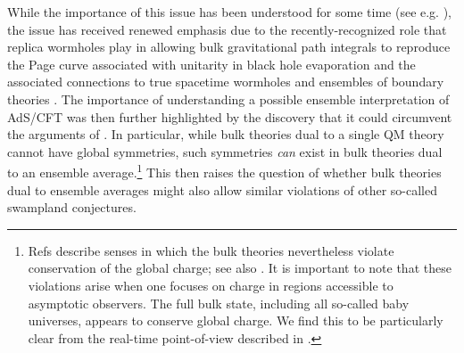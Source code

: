 \documentclass[11pt]{article}
\begin{document}
While the importance of this issue has been understood for some time (see e.g. \cite{MaldacenaMaoz}), the issue has received renewed emphasis due to the recently-recognized role that replica wormholes play in allowing bulk gravitational path integrals to reproduce the Page curve associated with unitarity in black hole evaporation \cite{Almheiri:2019qdq,Penington:2019kki} and the associated connections to true spacetime wormholes and ensembles of boundary theories \cite{Penington:2019kki,Marolf:2020xie,Marolf:2020rpm}.  
The importance of understanding a possible ensemble interpretation of AdS/CFT was then further highlighted by the discovery \cite{Hsin:2020mfa,Chen:2020ojn} that it could circumvent the arguments of \cite{Harlow:2018jwu,Harlow:2018tng}.
In particular, while bulk theories dual to a single QM theory cannot have global symmetries, such symmetries {\it can} exist in bulk theories dual to an ensemble average.\footnote{
    Refs \cite{Hsin:2020mfa,Chen:2020ojn} describe senses in which the bulk theories nevertheless violate conservation of the global charge; see also \cite{Belin:2020jxr}.
    It is important to note that these violations arise when one focuses on charge in regions accessible to asymptotic observers.
    The full bulk state, including all so-called baby universes, appears to conserve global charge.
    We find this to be particularly clear from the real-time point-of-view described in \cite{Marolf:2020rpm,Colin-Ellerin:2020mva}.
}
This then raises the question of whether bulk theories dual to ensemble averages might also allow similar violations of other so-called swampland conjectures.
\end{document}
